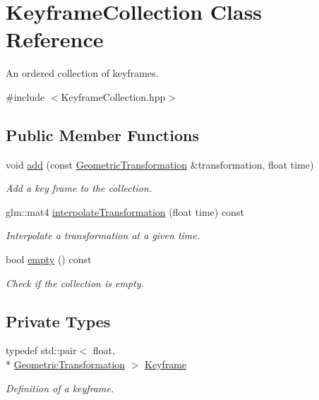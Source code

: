\hypertarget{classKeyframeCollection}{\section{Keyframe\+Collection Class Reference}
\label{classKeyframeCollection}
}


An ordered collection of keyframes.  




{\ttfamily \#include $<$Keyframe\+Collection.\+hpp$>$}

\subsection*{Public Member Functions}
\begin{DoxyCompactItemize}
\item 
void \hyperlink{classKeyframeCollection_a3a64207c2b2423818dc1dd8124c6441b}{add} (const \hyperlink{classGeometricTransformation}{Geometric\+Transformation} \&transformation, float time)
\begin{DoxyCompactList}\small\item\em Add a key frame to the collection. \end{DoxyCompactList}\item 
glm\+::mat4 \hyperlink{classKeyframeCollection_a15a2b936aafe20d9a486defbdc3fcb50}{interpolate\+Transformation} (float time) const 
\begin{DoxyCompactList}\small\item\em Interpolate a transformation at a given time. \end{DoxyCompactList}\item 
bool \hyperlink{classKeyframeCollection_a919aa0bd438836d7035424aa9401c994}{empty} () const 
\begin{DoxyCompactList}\small\item\em Check if the collection is empty. \end{DoxyCompactList}\end{DoxyCompactItemize}
\subsection*{Private Types}
\begin{DoxyCompactItemize}
\item 
typedef std\+::pair$<$ float, \\*
\hyperlink{classGeometricTransformation}{Geometric\+Transformation} $>$ \hyperlink{classKeyframeCollection_a06ac3762e94d3485f093371d0ee8d0c9}{Keyframe}
\begin{DoxyCompactList}\small\item\em Definition of a keyframe. \end{DoxyCompactList}\end{DoxyCompactItemize}
